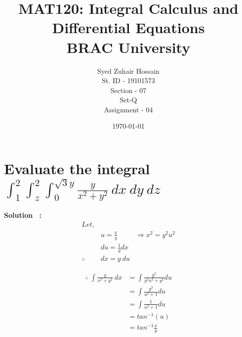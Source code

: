 \documentclass[12pt]{article}
\begin{document}
\title{MAT120: Integral Calculus and
Differential Equations \\
BRAC University}

\author{Syed Zuhair Hossain \\ St. ID - 19101573 \\ Section - 07 \\ Set-Q \\ Assignment - 04}
\date{\today}
\maketitle


\section{Evaluate the integral \\[5mm]
        $\int_{1}^{2} \int_{z}^{2} \int_{0}^{\sqrt{3}y} \frac{y}{x^2 + y^2} \ dx \ dy \ dz$
        }

\textbf{Solution \ :}
\begin{align*}
    Let,\\
    &u = \frac{x}{y} & \Rightarrow x^2 = y^2 u^2\\
    &du = \frac{1}{y} dx\\
    \therefore \ &dx = y \ du
\end{align*}

\begin{align*}
    \therefore \ \int \frac{y}{x^2 + y^2} \ dx &= \int \frac{y^2}{y^2 u^2 + y^2 } du \\
    &= \int \frac{y^2}{u^2 + 1} du\\
    &= \int \frac{1}{u^2 +1} du\\
    &= tan^{-1}(u)\\
    &= tan^{-1}\frac{x}{y}
\end{align*}
\end{document}

